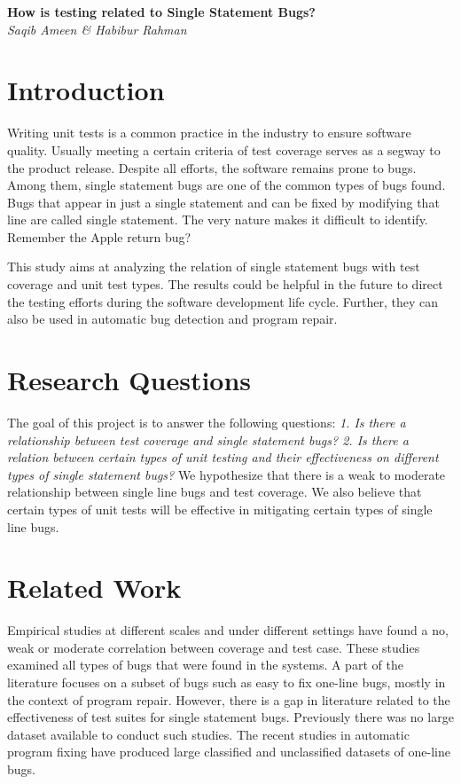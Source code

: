 \documentclass[11pt]{article}
\begin{document}
\begin{center}
{\bf \Large How is testing related to Single Statement Bugs?}\\
\vspace{.1in}
{\em Saqib Ameen \& Habibur Rahman}
\end{center}


\section{Introduction}

Writing unit tests is a common practice in the industry to ensure software quality. Usually meeting a certain criteria of test coverage serves as a segway to the product release. Despite all efforts, the software remains prone to bugs. Among them, single statement bugs are one of the common types of bugs found. Bugs that appear in just a single statement and can be fixed by modifying that line are called single statement. The very nature makes it difficult to identify. Remember the Apple return bug?

This study aims at analyzing the relation of single statement bugs with test coverage and unit test types. The results could be helpful in the future to direct the testing efforts during the software development life cycle. Further, they can also be used in automatic bug detection and program repair.

\section{Research Questions}

The goal of this project is to answer the following questions: \textit{1. Is there a relationship between test coverage and single statement bugs? 2. Is there a relation between certain types of unit testing and their effectiveness on different types of single statement bugs?} We hypothesize that there is a weak to moderate relationship between single line bugs and test coverage. We also believe that certain types of unit tests will be effective in mitigating certain types of single line bugs.

\section{Related Work}

Empirical studies \cite{gren2017relation, antinyan2018mythical, inozemtseva2014coverage} at different scales and under different settings have found a no, weak or moderate correlation between coverage and test case. These studies examined all types of bugs that were found in the systems. A part of the literature focuses on a subset of bugs such as easy to fix one-line bugs, mostly in the context of program repair. However, there is a gap in literature related to the effectiveness of test suites for single statement bugs. Previously there was no large dataset available to conduct such studies. The recent studies in automatic program fixing have produced large classified \cite{karampatsis2020often} and unclassified \cite{chen2019sequencer} datasets of one-line bugs.
\end{document}

